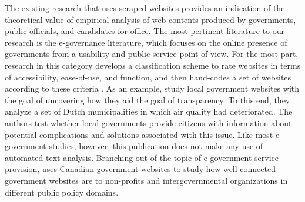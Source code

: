 \documentclass[11pt]{article}
\begin{document}
The existing research that uses scraped websites provides an indication of the theoretical value of empirical analysis of web contents produced by governments, public officials, and candidates for office. The most pertinent literature to our research is the e-governance literature, which focuses on the online presence of governments from a usability and public service point of view. For the most part, research in this category develops a classification scheme to rate websites in terms of accessibility, ease-of-use, and function, and then hand-codes a set of websites according to these criteria \citep[e.g., ][]{Urban2002,Armstrong2011,Feeney2017}. As an example, \cite{grimmelikhuijsen2012developing} study local government websites with the goal of uncovering how they aid the goal of transparency. To this end, they analyze a set of Dutch municipalities in which air quality had deteriorated. The authors test whether local governments provide citizens with information about potential complications and solutions associated with this issue. Like most e-government studies, however, this publication does not make any use of automated text analysis. Branching out of the topic of e-government service provision, \citet{mcnutt2010virtual} uses Canadian government websites to study how well-connected government websites are to non-profits and intergovernmental organizations in different public policy domains.
\end{document}
